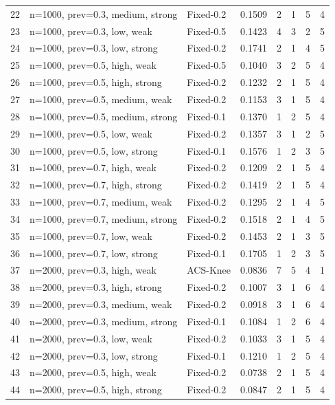 \begin{tabular}{rlllrrrr}
22 & n=1000, prev=0.3, medium, strong & Fixed-0.2 & 0.1509 & 2 & 1 & 5 & 4 \\
23 & n=1000, prev=0.3, low, weak & Fixed-0.5 & 0.1423 & 4 & 3 & 2 & 5 \\
24 & n=1000, prev=0.3, low, strong & Fixed-0.2 & 0.1741 & 2 & 1 & 4 & 5 \\
25 & n=1000, prev=0.5, high, weak & Fixed-0.5 & 0.1040 & 3 & 2 & 5 & 4 \\
26 & n=1000, prev=0.5, high, strong & Fixed-0.2 & 0.1232 & 2 & 1 & 5 & 4 \\
27 & n=1000, prev=0.5, medium, weak & Fixed-0.2 & 0.1153 & 3 & 1 & 5 & 4 \\
28 & n=1000, prev=0.5, medium, strong & Fixed-0.1 & 0.1370 & 1 & 2 & 5 & 4 \\
29 & n=1000, prev=0.5, low, weak & Fixed-0.2 & 0.1357 & 3 & 1 & 2 & 5 \\
30 & n=1000, prev=0.5, low, strong & Fixed-0.1 & 0.1576 & 1 & 2 & 3 & 5 \\
31 & n=1000, prev=0.7, high, weak & Fixed-0.2 & 0.1209 & 2 & 1 & 5 & 4 \\
32 & n=1000, prev=0.7, high, strong & Fixed-0.2 & 0.1419 & 2 & 1 & 5 & 4 \\
33 & n=1000, prev=0.7, medium, weak & Fixed-0.2 & 0.1295 & 2 & 1 & 4 & 5 \\
34 & n=1000, prev=0.7, medium, strong & Fixed-0.2 & 0.1518 & 2 & 1 & 4 & 5 \\
35 & n=1000, prev=0.7, low, weak & Fixed-0.2 & 0.1453 & 2 & 1 & 3 & 5 \\
36 & n=1000, prev=0.7, low, strong & Fixed-0.1 & 0.1705 & 1 & 2 & 3 & 5 \\
37 & n=2000, prev=0.3, high, weak & ACS-Knee & 0.0836 & 7 & 5 & 4 & 1 \\
38 & n=2000, prev=0.3, high, strong & Fixed-0.2 & 0.1007 & 3 & 1 & 6 & 4 \\
39 & n=2000, prev=0.3, medium, weak & Fixed-0.2 & 0.0918 & 3 & 1 & 6 & 4 \\
40 & n=2000, prev=0.3, medium, strong & Fixed-0.1 & 0.1084 & 1 & 2 & 6 & 4 \\
41 & n=2000, prev=0.3, low, weak & Fixed-0.2 & 0.1033 & 3 & 1 & 5 & 4 \\
42 & n=2000, prev=0.3, low, strong & Fixed-0.1 & 0.1210 & 1 & 2 & 5 & 4 \\
43 & n=2000, prev=0.5, high, weak & Fixed-0.2 & 0.0738 & 2 & 1 & 5 & 4 \\
44 & n=2000, prev=0.5, high, strong & Fixed-0.2 & 0.0847 & 2 & 1 & 5 & 4 \\

\end{tabular}
